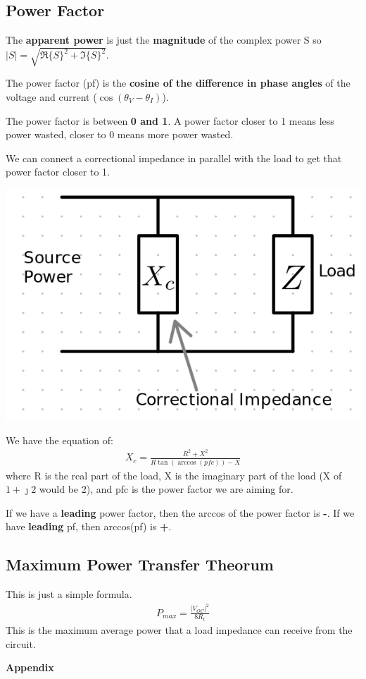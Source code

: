 \documentclass[12pt,letterpaper]{article} \usepackage{amsmath} \usepackage{graphicx} \usepackage[margin=1in]{geometry} \usepackage{longtable}  \usepackage{amssymb}
\begin{document}
	\subsection{Power Factor}
	The \textbf{apparent power} is just the \textbf{magnitude} of the complex power S so $|S| = \sqrt{\mathfrak{R}\{S\}^2 + \mathfrak{I}\{S\}^2}$.
		
	The power factor (pf) is the \textbf{cosine of the difference in phase angles} of the voltage and current ($\cos(\theta_V-\theta_I)$).
	
	The power factor is between\textbf{ 0 and 1}. A power factor closer to 1 means less power wasted, closer to 0 means more power wasted. 
	
	We can connect a correctional impedance in parallel with the load to get that power factor closer to 1. 
	\begin{center}
		\includegraphics[width=0.4\linewidth]{pfc}
	\end{center}
	We have the equation of: 
	\begin{align*}
		X_c = \frac{R^2+X^2}{R\tan(\arccos(pfc))-X}
	\end{align*}
	where R is the real part of the load, X is the imaginary part of the load (X of $1+\jmath 2$ would be 2), and pfc is the power factor we are aiming for. 
	
	If we have a \textbf{leading} power factor, then the arccos of the power factor is \textbf{-}. If we have \textbf{leading} pf, then arccos(pf) is \textbf{+}.
	
	\subsection{Maximum Power Transfer Theorum}
	This is just a simple formula. 
	\begin{align*}
		P_{max} = \frac{\left|V_{OC}\right|^2}{8R_t}
	\end{align*}
	This is the maximum average power that a load impedance can receive from the circuit.
	
	\newpage
	\appendix
	\begin{center}
		\Large\textbf{Appendix} \\
		\vspace{0.5em}
	\end{center}
	
\end{document}
